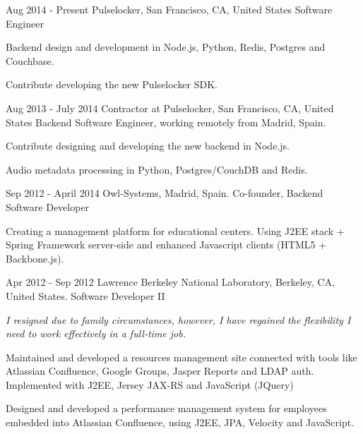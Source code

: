 
\experience
  {Aug 2014 - Present}
  {Pulselocker, San Francisco, CA, United States}
  {Software Engineer}
  {\vspace{-1em}\begin{rlist}
    \item Backend design and development in Node.js, Python, Redis, Postgres and Couchbase.
    \item Contribute developing the new Pulselocker SDK.
  \end{rlist}}

\experience
  {Aug 2013 - July 2014}
  {Contractor at Pulselocker, San Francisco, CA, United States}
  {Backend Software Engineer, working remotely from Madrid, Spain.}
  {\vspace{-1em}\begin{rlist}
    \item Contribute designing and developing the new backend in Node.js.
    \item Audio metadata processing in Python, Postgres/CouchDB and Redis.
  \end{rlist}}

\experience
  {Sep 2012 - April 2014}
  {Owl-Systems, Madrid, Spain.}
  {Co-founder, Backend Software Developer}
  {\vspace{-1em}\begin{rlist}
    \item Creating a management platform for educational centers. Using J2EE stack +
    Spring Framework server-side and enhanced Javascript clients (HTML5 +
    Backbone.js).
  \end{rlist}}

\experience
  {Apr 2012 - Sep 2012}
  {Lawrence Berkeley National Laboratory, Berkeley, CA, United States.}
  {Software Developer II}
  {\emph{I resigned due to family circumstances, however, I have
    regained the flexibility I need to work effectively in a full-time
    job.}
    \begin{rlist}
    \item Maintained and developed a resources management site
    connected with tools like Atlassian Confluence, Google Groups, Jasper
    Reports and LDAP auth. Implemented with J2EE, Jersey JAX-RS and
    JavaScript (JQuery)
    \item Designed and developed a performance management system for
    employees embedded into Atlassian Confluence, using J2EE, JPA,
    Velocity and JavaScript.
  \end{rlist}}

